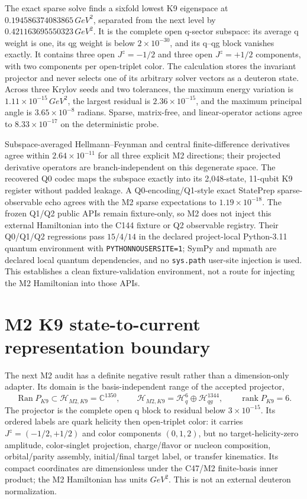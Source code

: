 \documentclass[11pt,oneside]{book}
\begin{document}
The exact sparse solve finds a sixfold lowest K9 eigenspace at
$0.194586374083865\,\unit{GeV^2}$, separated from the next level by
$0.421163695550323\,\unit{GeV^2}$. It is the complete open q-sector
subspace: its average q weight is one, its qg weight is below $2\times10^{-30}$,
and its q--qg block vanishes exactly. It contains three open
$J^z=-1/2$ and three open $J^z=+1/2$ components, with two components per
open-triplet color. The calculation stores the invariant projector and never
selects one of its arbitrary solver vectors as a deuteron state. Across three
Krylov seeds and two tolerances, the maximum energy variation is
$1.11\times10^{-15}\,\unit{GeV^2}$, the largest residual is
$2.36\times10^{-15}$, and the maximum principal angle is
$3.65\times10^{-8}$ radians. Sparse, matrix-free, and linear-operator
actions agree to $8.33\times10^{-17}$ on the deterministic probe.

Subspace-averaged Hellmann--Feynman and central finite-difference derivatives
agree within $2.64\times10^{-11}$ for all three explicit M2 directions; their
projected derivative operators are branch-independent on this degenerate
space. The recovered Q0 codec maps the subspace exactly into its 2,048-state,
11-qubit K9 register without padded leakage. A Q0-encoding/Q1-style exact
StatePrep sparse-observable echo agrees with the M2 sparse expectations to
$1.19\times10^{-18}$. The frozen Q1/Q2 public APIs remain fixture-only, so
M2 does not inject this external Hamiltonian into the C144 fixture or Q2
observable registry. Their Q0/Q1/Q2 regressions pass $15/4/14$ in the declared
project-local Python-3.11 quantum environment with \texttt{PYTHONNOUSERSITE=1};
SymPy and mpmath are declared local quantum dependencies, and no
\texttt{sys.path} user-site injection is used. This establishes a clean
fixture-validation environment, not a route for injecting the M2 Hamiltonian
into those APIs.

\section{M2 K9 state-to-current representation boundary}
\label{sec:m2-state-current-boundary}

The next M2 audit has a definite negative result rather than a dimension-only
adapter. Its domain is the basis-independent range of the accepted projector,
\begin{equation}
 \operatorname{Ran}P_{K9}\subset\mathcal H_{M2,K9}=\mathbb C^{1350},
 \qquad \mathcal H_{M2,K9}=\mathcal H_q^6\oplus\mathcal H_{qg}^{1344},
 \qquad \operatorname{rank}P_{K9}=6.
 \label{eq:m2-current-domain}
\end{equation}
The projector is the complete open q block to residual below
$3\times10^{-15}$. Its ordered labels are quark helicity then open-triplet
color: it carries $J^z=(-1/2,+1/2)$ and color components $(0,1,2)$, but no
target-helicity-zero amplitude, color-singlet projection, charge/flavor or
nucleon composition, orbital/parity assembly, initial/final target label, or
transfer kinematics. Its compact coordinates are dimensionless under the
C47/M2 finite-basis inner product; the M2 Hamiltonian has units
$\unit{GeV^2}$. This is not an external deuteron normalization.
\end{document}
